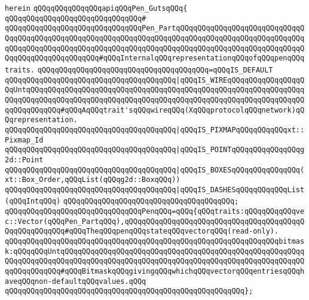 \verb|herein|\newline
\newline
\verb|qQQqqQQqqQQqqQQqapiqQQqPen_GutsqQQq{|\newline
\verb|qQQqqQQqqQQqqQQqqQQqqQQqqQQqqQQq#|\newline
\verb|qQQqqQQqqQQqqQQqqQQqqQQqqQQqqQQqPen_PartqQQqqQQqqQQqqQQqqQQqqQQqqQQqqQQqqQQqqQQqqQQqqQQqqQQqqQQqqQQqqQQqqQQqqQQqqQQqqQQqqQQqqQQqqQQqqQQqqQQqqQQqqQQqqQQqqQQqqQQqqQQqqQQqqQQqqQQqqQQqqQQqqQQqqQQqqQQqqQQqqQQqqQQqqQQqqQQqqQQqqQQqqQQqqQQq#qQQqInternalqQQqrepresentationqQQqofqQQqpenqQQqtraits.|\newline
\verb|qQQqqQQqqQQqqQQqqQQqqQQqqQQqqQQqqQQqqQQq=qQQqIS_DEFAULT|\newline
\verb|qQQqqQQqqQQqqQQqqQQqqQQqqQQqqQQqqQQqqQQq|\verb#|qQQqIS_WIREqQQqqQQqqQQqqQQqqQQqUntqQQqqQQqqQQqqQQqqQQqqQQqqQQqqQQqqQQqqQQqqQQqqQQqqQQqqQQqqQQqqQQqqQQqqQQqqQQqqQQqqQQqqQQqqQQqqQQqqQQqqQQqqQQqqQQqqQQqqQQqqQQqqQQqqQQqqQQqqQQqqQQqqQQq#\verb|#qQQqAqQQqtrait'sqQQqwireqQQq(XqQQqprotocolqQQqnetwork)qQQqrepresentation.|\newline
\verb|qQQqqQQqqQQqqQQqqQQqqQQqqQQqqQQqqQQqqQQq|\verb#|qQQqIS_PIXMAPqQQqqQQqqQQqxt::Pixmap_Id#\newline
\verb|qQQqqQQqqQQqqQQqqQQqqQQqqQQqqQQqqQQqqQQq|\verb#|qQQqIS_POINTqQQqqQQqqQQqqQQqg2d::Point#\newline
\verb|qQQqqQQqqQQqqQQqqQQqqQQqqQQqqQQqqQQqqQQq|\verb#|qQQqIS_BOXESqQQqqQQqqQQqqQQq(xt::Box_Order,qQQqList(qQQqg2d::BoxqQQq))#\newline
\verb|qQQqqQQqqQQqqQQqqQQqqQQqqQQqqQQqqQQqqQQq|\verb#|qQQqIS_DASHESqQQqqQQqqQQqList(qQQqIntqQQq)#\newline
\verb|qQQqqQQqqQQqqQQqqQQqqQQqqQQqqQQqqQQqqQQq;|\newline
\newline
\verb|qQQqqQQqqQQqqQQqqQQqqQQqqQQqqQQqPenqQQq=qQQq{qQQqtraits:qQQqqQQqqQQqvec::Vector(qQQqPen_PartqQQq),qQQqqQQqqQQqqQQqqQQqqQQqqQQqqQQqqQQqqQQqqQQqqQQqqQQqqQQq#qQQqTheqQQqpenqQQqstateqQQqvectorqQQq(read-only).|\newline
\verb|qQQqqQQqqQQqqQQqqQQqqQQqqQQqqQQqqQQqqQQqqQQqqQQqqQQqqQQqqQQqqQQqbitmask:qQQqqQQqUntqQQqqQQqqQQqqQQqqQQqqQQqqQQqqQQqqQQqqQQqqQQqqQQqqQQqqQQqqQQqqQQqqQQqqQQqqQQqqQQqqQQqqQQqqQQqqQQqqQQqqQQqqQQqqQQqqQQqqQQqqQQqqQQqqQQqqQQqqQQq#qQQqBitmaskqQQqgivingqQQqwhichqQQqvectorqQQqentriesqQQqhaveqQQqnon-defaultqQQqvalues.qQQq|\newline
\verb|qQQqqQQqqQQqqQQqqQQqqQQqqQQqqQQqqQQqqQQqqQQqqQQqqQQqqQQq};|\newline
